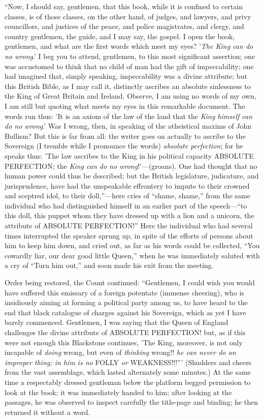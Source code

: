 ``Now, I should say, gentlemen, that this book,
while it is confined to certain classes, is of those
classes, on the other hand, of judges, and lawyers, and
privy councillors, and justices of the peace, and police
magistrates, and clergy, and country gentlemen, the
guide, and I may say, the gospel. I open the book,
gentlemen, and what are the first words which meet my
eyes? '\emph{The King can do no wrong}.' I beg you to
attend, gentlemen, to this most significant assertion;
one was accustomed to think that no child of man had the
gift of impeccability; one had imagined that, simply
speaking, impeccability was a divine attribute; but this
British Bible, as I may call it, distinctly ascribes an
absolute sinlessness to the King of Great Britain and
Ireland. Observe, I am using no words of my own, I am
still but quoting what meets my eyes in this remarkable
document. The words run thus: 'It is an axiom of the law
of the land that the \emph{King himself can do no wrong}.'
Was I wrong, then, in speaking of the atheistical maxims
of John Bullism? But this is far from all: the writer
goes on actually to ascribe to the Sovereign (I tremble
while I pronounce the words) \emph{absolute perfection};
for he speaks thus: 'The law ascribes to the King in his
political capacity ABSOLUTE PERFECTION; the \emph{King can
do no wrong}!'—(groans). One had thought that no
human power could thus be described; but the British
legislature, judicature, and jurisprudence, have had the
unspeakable effrontery to impute to their crowned and
sceptred idol, to their doll,''—here cries of
``shame, shame,'' from the same individual who
had distinguished himself in an earlier part of the
speech—``to this doll, this puppet whom they
have dressed up with a lion and a unicorn, the attribute
of ABSOLUTE PERFECTION!'' Here the individual who had
several times interrupted the speaker sprung up, in spite
of the efforts of persons about him to keep him down, and
cried out, as far as his words could be collected,
``You cowardly liar, our dear good little
Queen,'' when he was immediately saluted with a cry
of ``Turn him out,'' and soon made his exit from
the meeting.

Order being restored, the Count continued:
``Gentlemen, I could wish you would have suffered
this emissary of a foreign potentate (immense cheering),
who is insidiously aiming at forming a political party
among us, to have heard to the end that black catalogue
of charges against his Sovereign, which as yet I have
barely commenced. Gentlemen, I was saying that the Queen
of England challenges the divine attribute of ABSOLUTE
PERFECTION! but, as if this were not enough this
Blackstone continues, 'The King, moreover, is not only
incapable of \emph{doing} wrong, but even of \emph{thinking}
wrong!! \emph{he can never do an improper thing; in him is
no} FOLLY \emph{or} WEAKNESS!!!''' (Shudders
and cheers from the vast assemblage, which lasted
alternately some minutes.) At the same time a respectably
dressed gentleman below the platform begged permission to
look at the book; it was immediately handed to him; after
looking at the passages, he was observed to inspect
carefully the title-page and binding; he then returned it
without a word.

